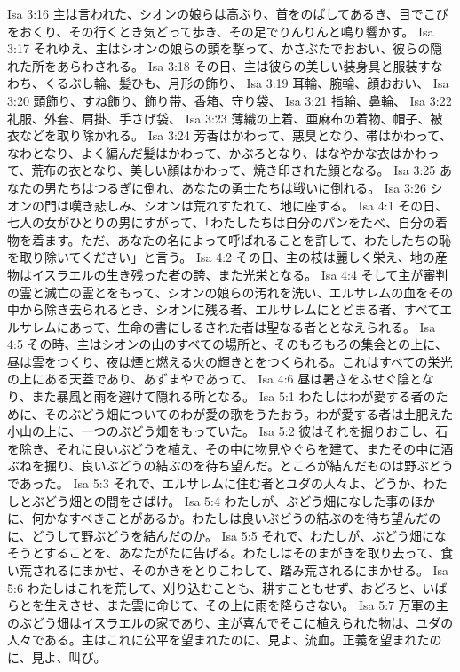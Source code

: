 Isa 3:16  主は言われた、シオンの娘らは高ぶり、首をのばしてあるき、目でこびをおくり、その行くとき気どって歩き、その足でりんりんと鳴り響かす。
Isa 3:17  それゆえ、主はシオンの娘らの頭を撃って、かさぶたでおおい、彼らの隠れた所をあらわされる。
Isa 3:18  その日、主は彼らの美しい装身具と服装すなわち、くるぶし輪、髪ひも、月形の飾り、
Isa 3:19  耳輪、腕輪、顔おおい、
Isa 3:20  頭飾り、すね飾り、飾り帯、香箱、守り袋、
Isa 3:21  指輪、鼻輪、
Isa 3:22  礼服、外套、肩掛、手さげ袋、
Isa 3:23  薄織の上着、亜麻布の着物、帽子、被衣などを取り除かれる。
Isa 3:24  芳香はかわって、悪臭となり、帯はかわって、なわとなり、よく編んだ髪はかわって、かぶろとなり、はなやかな衣はかわって、荒布の衣となり、美しい顔はかわって、焼き印された顔となる。
Isa 3:25  あなたの男たちはつるぎに倒れ、あなたの勇士たちは戦いに倒れる。
Isa 3:26  シオンの門は嘆き悲しみ、シオンは荒れすたれて、地に座する。
Isa 4:1  その日、七人の女がひとりの男にすがって、「わたしたちは自分のパンをたべ、自分の着物を着ます。ただ、あなたの名によって呼ばれることを許して、わたしたちの恥を取り除いてください」と言う。
Isa 4:2  その日、主の枝は麗しく栄え、地の産物はイスラエルの生き残った者の誇、また光栄となる。
Isa 4:4  そして主が審判の霊と滅亡の霊とをもって、シオンの娘らの汚れを洗い、エルサレムの血をその中から除き去られるとき、シオンに残る者、エルサレムにとどまる者、すべてエルサレムにあって、生命の書にしるされた者は聖なる者ととなえられる。
Isa 4:5  その時、主はシオンの山のすべての場所と、そのもろもろの集会との上に、昼は雲をつくり、夜は煙と燃える火の輝きとをつくられる。これはすべての栄光の上にある天蓋であり、あずまやであって、
Isa 4:6  昼は暑さをふせぐ陰となり、また暴風と雨を避けて隠れる所となる。
Isa 5:1  わたしはわが愛する者のために、そのぶどう畑についてのわが愛の歌をうたおう。わが愛する者は土肥えた小山の上に、一つのぶどう畑をもっていた。
Isa 5:2  彼はそれを掘りおこし、石を除き、それに良いぶどうを植え、その中に物見やぐらを建て、またその中に酒ぶねを掘り、良いぶどうの結ぶのを待ち望んだ。ところが結んだものは野ぶどうであった。
Isa 5:3  それで、エルサレムに住む者とユダの人々よ、どうか、わたしとぶどう畑との間をさばけ。
Isa 5:4  わたしが、ぶどう畑になした事のほかに、何かなすべきことがあるか。わたしは良いぶどうの結ぶのを待ち望んだのに、どうして野ぶどうを結んだのか。
Isa 5:5  それで、わたしが、ぶどう畑になそうとすることを、あなたがたに告げる。わたしはそのまがきを取り去って、食い荒されるにまかせ、そのかきをとりこわして、踏み荒されるにまかせる。
Isa 5:6  わたしはこれを荒して、刈り込むことも、耕すこともせず、おどろと、いばらとを生えさせ、また雲に命じて、その上に雨を降らさない。
Isa 5:7  万軍の主のぶどう畑はイスラエルの家であり、主が喜んでそこに植えられた物は、ユダの人々である。主はこれに公平を望まれたのに、見よ、流血。正義を望まれたのに、見よ、叫び。
